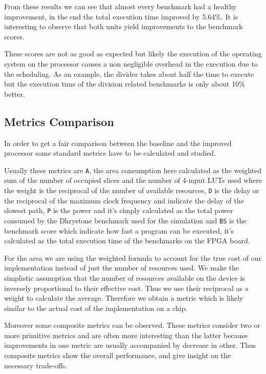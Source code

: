 From these results we can see that almost every benchmark had a healthy improvement, in the end
the total execution time improved by 5.64\%.
It is interesting to observe that both units yield improvements to the benchmark scores.

These scores are not as good as expected but likely the execution of the operating system
on the processor causes a non negligible overhead in the execution due to the scheduling. As an example, the
divider takes about half the time to execute but the execution time of the division related
benchmarks is only about 10\% better.

\subsection{Metrics Comparison}
\label{ssec:metrics}

In order to get a fair comparison between the baseline and the improved processor some standard
metrics have to be calculated and studied.

Usually these metrics are \texttt{A}, the area consumption here calculated as the weighted sum of the
number of occupied slices and the number of 4-input LUTs used where the weight is the reciprocal
of the number of available resources, \texttt{D} is the delay or the reciprocal of the maximum clock frequency
and indicate the delay of the slowest path, \texttt{P} is the power and it's simply calculated as the total
power consumed by the Dhrystone benchmark used for the simulation and \texttt{BS} is the benchmark
score which indicate how fast a program can be executed, it's calculated as the total execution
time of the benchmarks on the FPGA board.

For the area we are using the weighted formula to account for the true cost of our implementation instead of just the number of resources used.
We make the simplistic assumption that the number of resources available on the device is inversely proportional to their effective cost. Thus we use their reciprocal as a weight to calculate the average. Therefore we obtain a metric which is likely similar to the actual cost of the implementation on a chip.

Moreover some composite metrics can be observed. These metrics consider two or more primitive
metrics and are often more interesting than the latter because improvements in one metric are usually accompanied by decrease in other.
Thus composite metrics show the overall performance, and give insight on the necessary trade-offs.

